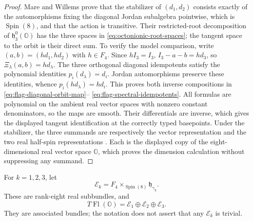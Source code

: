 \documentclass[11pt]{article}
\theoremstyle{definition}
\newcommand{\Oo}{\mathbb O}
\begin{document}
\begin{proof}
Mare and Willems prove that the stabilizer of \((d_1,d_2)\) consists
exactly of the automorphisms fixing the diagonal Jordan subalgebra
pointwise, which is \(\operatorname{Spin}(8)\), and that the action is
transitive.  Their restricted-root decomposition of
\(\mathfrak h_3^0(\Oo)\) has the three spaces in
\eqref{eq:octonionic-root-spaces}; the tangent space to the orbit is their
direct sum.  To verify the model comparison, write
\((a,b)=(h d_1,h d_2)\) with \(h\in F_4\).  Since \(hI_3=I_3\),
\(I_3-a-b=hd_3\), so \(\Xi_\lambda(a,b)=hd_\lambda\).
The three orthogonal diagonal idempotents satisfy the polynomial
identities \(p_i(d_\lambda)=d_i\).  Jordan automorphisms preserve these
identities, whence \(p_i(hd_\lambda)=hd_i\).  This proves both inverse
compositions in \eqref{eq:flag-diagonal-orbit-map}--
\eqref{eq:flag-spectral-idempotents}.  All formulas are polynomial on
the ambient real vector spaces with nonzero constant denominators, so the
maps are smooth.  Their differentials are inverse, which gives the
displayed tangent identification at the correctly typed basepoints.
Under the stabilizer, the three summands are respectively
the vector representation and the two real half-spin representations
\cite[pp.~491--492, especially the discussion around
Equation~(2.10)]{MareWillems2013}.  Each is the displayed copy of the
eight-dimensional real vector space \(\Oo\), which proves the dimension
calculation without suppressing any summand.
\end{proof}

For \(k=1,2,3\), let
\[
 \mathcal E_k=F_4\times_{\operatorname{Spin}(8)}
                         \mathfrak h_{\gamma_k}.
\]
These are rank-eight real subbundles, and
\begin{equation}
 T\operatorname{Fl}(\Oo)=
 \mathcal E_1\oplus\mathcal E_2\oplus\mathcal E_3.
 \label{eq:octonionic-tangent-bundles}
\end{equation}
They are associated bundles; the notation does not assert that any
\(\mathcal E_k\) is trivial.
\end{document}
